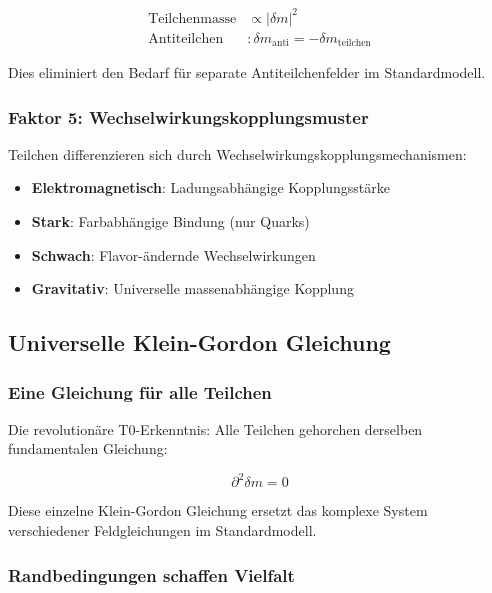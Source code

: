 \documentclass[12pt,a4paper]{article}
\newcommand{\deltafield}{\ensuremath{\delta m}}
\newcommand{\mypropto}{\ensuremath{\propto}}
\begin{document}
	\begin{align}
		\text{Teilchenmasse} &\mypropto |\deltafield|^2 \\
		\text{Antiteilchen} &: \deltafield_{\text{anti}} = -\deltafield_{\text{teilchen}}
	\end{align}
	
	Dies eliminiert den Bedarf für separate Antiteilchenfelder im Standardmodell.
	
	\subsubsection{Faktor 5: Wechselwirkungskopplungsmuster}
	\label{subsubsec:kopplungsmuster}
	
	Teilchen differenzieren sich durch Wechselwirkungskopplungsmechanismen:
	\begin{itemize}
		\item \textbf{Elektromagnetisch}: Ladungsabhängige Kopplungsstärke
		\item \textbf{Stark}: Farbabhängige Bindung (nur Quarks)
		\item \textbf{Schwach}: Flavor-ändernde Wechselwirkungen
		\item \textbf{Gravitativ}: Universelle massenabhängige Kopplung
	\end{itemize}
	
	\subsection{Universelle Klein-Gordon Gleichung}
	\label{subsec:universelle_klein_gordon}
	
	\subsubsection{Eine Gleichung für alle Teilchen}
	\label{subsubsec:eine_gleichung}
	
	Die revolutionäre T0-Erkenntnis: Alle Teilchen gehorchen derselben fundamentalen Gleichung:
	
	\begin{equation}
		\boxed{\partial^2 \deltafield = 0}
		\label{eq:universelle_gleichung}
	\end{equation}
	
	Diese einzelne Klein-Gordon Gleichung ersetzt das komplexe System verschiedener Feldgleichungen im Standardmodell.
	
	\subsubsection{Randbedingungen schaffen Vielfalt}
	\label{subsubsec:randbedingungen}
	
\end{document}
